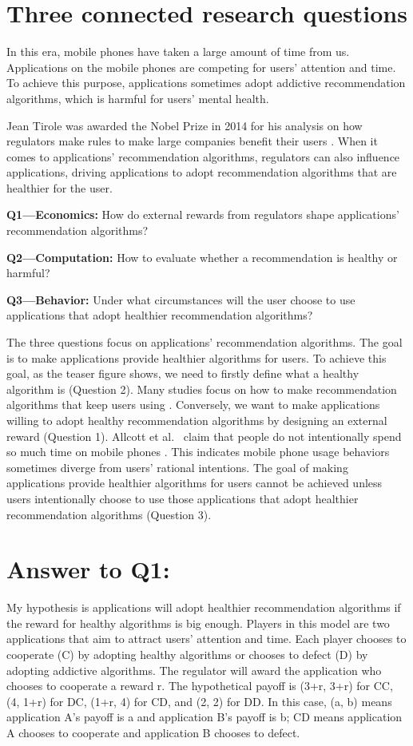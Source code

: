 \section{Three connected research questions}
In this era, mobile phones have taken a large amount of time from us. Applications on the mobile phones are competing for users’ attention and time. To achieve this purpose, applications sometimes adopt addictive recommendation algorithms, which is harmful for users’ mental health.

Jean Tirole was awarded the Nobel Prize in 2014 for his analysis on how regulators make rules to make large companies benefit their users \cite{nobel2014}. When it comes to applications’ recommendation algorithms, regulators can also influence applications, driving applications to adopt recommendation algorithms that are healthier for the user.

\textbf{Q1—Economics:} How do external rewards from regulators shape applications’ recommendation algorithms?\par
\textbf{Q2—Computation:} How to evaluate whether a recommendation is healthy or harmful?\par
\textbf{Q3—Behavior:} Under what circumstances will the user choose to use applications that adopt healthier recommendation algorithms?\par

The three questions focus on applications’ recommendation algorithms. The goal is to make applications provide healthier algorithms for users. To achieve this goal, as the teaser figure shows, we need to firstly define what a healthy algorithm is (Question 2). Many studies focus on how to make recommendation algorithms that keep users using \cite{zou2019}. Conversely, we want to make applications willing to adopt healthy recommendation algorithms by designing an external reward (Question 1). Allcott et al.~\cite{allcott2022} claim that people do not intentionally spend so much time on mobile phones \cite{wu2026}. This indicates mobile phone usage behaviors sometimes diverge from users’ rational intentions. The goal of making applications provide healthier algorithms for users cannot be achieved unless users intentionally choose to use those applications that adopt healthier recommendation algorithms (Question 3).

\section{Answer to Q1:}
My hypothesis is applications will adopt healthier recommendation algorithms if the reward for healthy algorithms is big enough. Players in this model are two applications that aim to attract users’ attention and time. Each player chooses to cooperate (C) by adopting healthy algorithms or chooses to defect (D) by adopting addictive algorithms. The regulator will award the application who chooses to cooperate a reward r. The hypothetical payoff is (3+r, 3+r) for CC, (4, 1+r) for DC, (1+r, 4) for CD, and (2, 2) for DD. In this case, (a, b) means application A’s payoff is a and application B’s payoff is b; CD means application A chooses to cooperate and application B chooses to defect.

